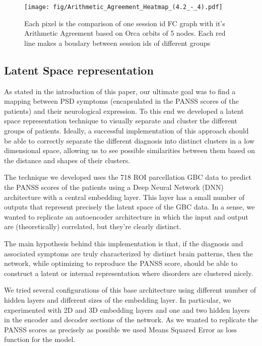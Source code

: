 \documentclass[fleqn,moreauthors,10pt]{ds_report}
\begin{document}
\begin{figure}[h!]
    \centering
    \texttt{[image: fig/Arithmetic\_Agreement\_Heatmap\_(4.2\_-\_4).pdf]}
    \caption{Each pixel is the comparison of one session id FC graph with it's Arithmetic Agreement based on Orca orbits of 5 nodes. Each red line makes a boudary between session ids of different groups}
    \label{fig:orca_blockmodel}
\end{figure}


\subsection*{Latent Space representation}

As stated in the introduction of this paper, our ultimate goal was to find a mapping between PSD symptoms (encapsulated in the PANSS scores of the patients) and their neurological expression. To this end we developed a latent space representation technique to visually separate and cluster the different groups of patients. Ideally, a successful implementation of this approach should be able to correctly separate the different diagnosis into distinct clusters in a low dimensional space, allowing us to see possible similarities between them based on the distance and shapes of their clusters.

The technique we developed uses the 718 ROI parcellation GBC data to predict the PANSS scores of the patients using a Deep Neural Network (DNN) architecture with a central embedding layer. This layer has a small number of outputs that represent precisely the latent space of the GBC data. In a sense, we wanted to replicate an autoencoder architecture in which the input and output are (theoretically) correlated, but they're clearly distinct. 

The main hypothesis behind this implementation is that, if the diagnosis and associated symptoms are truly characterized by distinct brain patterns, then the network, while optimizing to reproduce the PANSS score, should be able to construct a latent or internal representation where disorders are clustered nicely. 

We tried several configurations of this base architecture using different number of hidden layers and different sizes of the embedding layer. In particular, we experimented with 2D and 3D embedding layers and one and two hidden layers in the encoder and decoder sections of the network. As we wanted to replicate the PANSS scores as precisely as possible we used Means Squared Error as loss function for the model.
\end{document}
